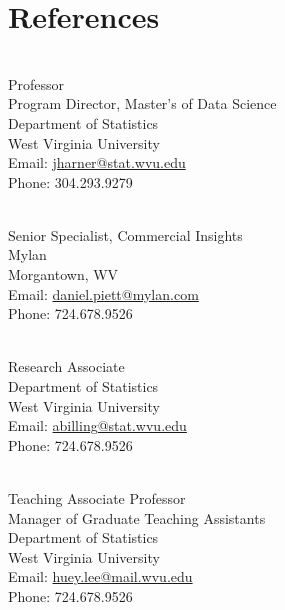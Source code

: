 \documentclass[letterpaper]{deedy-resume} %
\begin{document}

\lastupdated %


\section{References}
\vspace{10pt}
\begin{flushleft}
\\
Professor\\
Program Director, Master's of Data Science\\
Department of Statistics\\
West Virginia University\\
Email: \href{mailto:jharner@stat.wvu.edu}{jharner@stat.wvu.edu}\\
Phone: 304.293.9279\\
\vspace{30pt}

\\
Senior Specialist, Commercial Insights\\
Mylan\\
Morgantown, WV\\
Email: \href{mailto:daniel.piett@mylan.com}{daniel.piett@mylan.com}\\
Phone: 724.678.9526\\
\vspace{30pt}

\\
Research Associate\\
Department of Statistics\\
West Virginia University\\
Email: \href{mailto:abilling@stat.wvu.edu}{abilling@stat.wvu.edu}\\
Phone: 724.678.9526\\
\vspace{30pt}

\\
Teaching Associate Professor\\
Manager of Graduate Teaching Assistants\\
Department of Statistics\\
West Virginia University\\
Email: \href{mailto:huey.lee@mail.wvu.edu}{huey.lee@mail.wvu.edu}\\
Phone: 724.678.9526\\
\vspace{30pt}


\end{flushleft}
\end{document}
